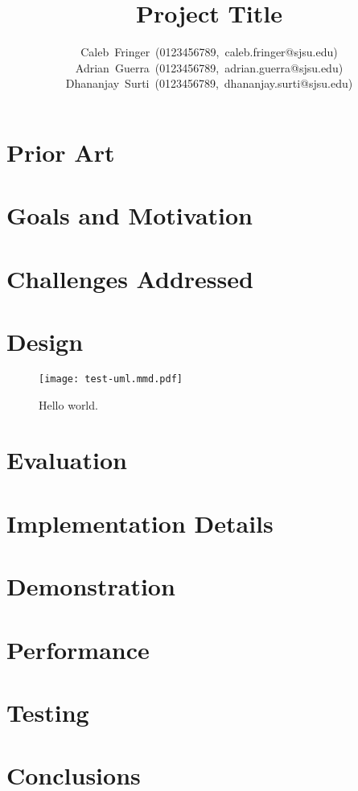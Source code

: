 \documentclass[journal,twocolumn,american]{IEEEtran}
\begin{document}
\title{Project Title}
\author{%
Caleb~Fringer~(0123456789,~caleb.fringer@sjsu.edu)\\%
Adrian~Guerra~(0123456789,~adrian.guerra@sjsu.edu)\\%
Dhananjay~Surti~(0123456789,~dhananjay.surti@sjsu.edu)%
}
\maketitle


\section{Prior Art}
\lipsum[1]

\section{Goals and Motivation}
\lipsum[1]

\section{Challenges Addressed}
\lipsum[1]

\section{Design}
\lipsum[1]

\begin{figure}[h]
    \centering
    \texttt{[image: test-uml.mmd.pdf]}
    \caption{Hello world.}
\end{figure}

\lipsum[2]

\section{Evaluation}
\lipsum[1]

\section{Implementation Details}
\lipsum[1]

\section{Demonstration}
\lipsum[1]

\section{Performance}
\lipsum[1]

\section{Testing}
\lipsum[1]

\section{Conclusions}
\lipsum[1]
\end{document}
